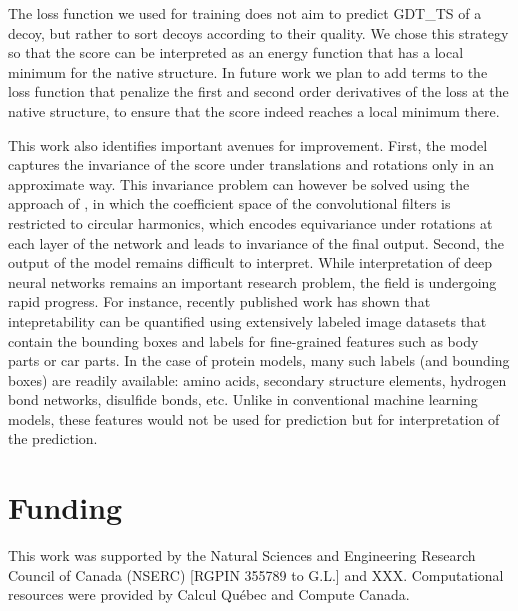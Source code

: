 \documentclass{bioinfo}
\begin{document}
The loss function we used for training does not aim to predict GDT\_TS
of a decoy, but rather to sort decoys according to their quality. We
chose this strategy so that the score can be interpreted as an energy
function that has a local minimum for the native structure. In future
work we plan to add terms to the loss function that penalize the first
and second order derivatives of the loss at the native structure, to
ensure that the score indeed reaches a local minimum there.

This work also identifies important avenues for improvement. First,
the model captures the invariance of the score under translations and
rotations only in an approximate way. This invariance problem can
however be solved using the approach of \citealp{worrall2016harmonic}, in which the coefficient space of
the convolutional filters is restricted to circular harmonics, which
encodes equivariance under rotations at each layer of the network and
leads to invariance of the final output.
%
Second, the output of the model remains difficult to interpret. While
interpretation of deep neural networks remains an important research
problem, the field is undergoing rapid progress. For instance,
recently published work \citep{bau2017network} has shown that
intepretability can be quantified using extensively labeled image
datasets that contain the bounding boxes and labels for fine-grained
features such as body parts or car parts. In the case of protein
models, many such labels (and bounding boxes) are readily available:
amino acids, secondary structure elements, hydrogen bond networks,
disulfide bonds, etc. Unlike in conventional machine learning models,
these features would not be used for prediction but for interpretation
of the prediction.

\section*{Funding}
This work was supported by the Natural Sciences and Engineering Research
Council of Canada (NSERC) [RGPIN 355789 to G.L.] and XXX.
Computational resources were provided by Calcul Qu{\'e}bec and
Compute Canada.




\end{document}
